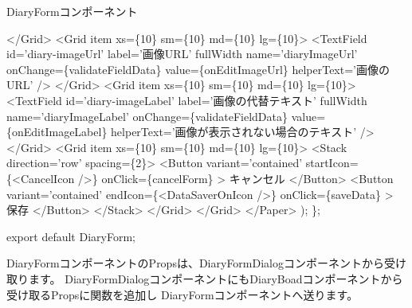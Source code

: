\begin{starterprogram}[]{DiaryFormコンポーネント}
{          \textless{}/Grid\textgreater{}
          \textless{}Grid item xs=\{10\} sm=\{10\} md=\{10\} lg=\{10\}\textgreater{}
            \textless{}TextField
              id='diary{-}imageUrl'
              label='画像URL'
              fullWidth
              name='diaryImageUrl'
              onChange=\{validateFieldData\}
              value=\{onEditImageUrl\}
              helperText='画像のURL'
            /\textgreater{}
          \textless{}/Grid\textgreater{}
          \textless{}Grid item xs=\{10\} sm=\{10\} md=\{10\} lg=\{10\}\textgreater{}
            \textless{}TextField
              id='diary{-}imageLabel'
              label='画像の代替テキスト'
              fullWidth
              name='diaryImageLabel'
              onChange=\{validateFieldData\}
              value=\{onEditImageLabel\}
              helperText='画像が表示されない場合のテキスト'
            /\textgreater{}
          \textless{}/Grid\textgreater{}
          \textless{}Grid item xs=\{10\} sm=\{10\} md=\{10\} lg=\{10\}\textgreater{}
            \textless{}Stack direction='row' spacing=\{2\}\textgreater{}
              \textless{}Button
                variant='contained'
                startIcon=\{\textless{}CancelIcon /\textgreater{}\}
                onClick=\{cancelForm\}
              \textgreater{}
                キャンセル
              \textless{}/Button\textgreater{}
              \textless{}Button
                variant='contained'
                endIcon=\{\textless{}DataSaverOnIcon /\textgreater{}\}
                onClick=\{saveData\}
              \textgreater{}
                保存
              \textless{}/Button\textgreater{}
            \textless{}/Stack\textgreater{}
          \textless{}/Grid\textgreater{}
        \textless{}/Grid\textgreater{}
      \textless{}/Paper\textgreater{}
    );
  \};

  export default DiaryForm;}\end{starterprogram}

DiaryFormコンポーネントのPropsは、DiaryFormDialogコンポーネントから受け取ります。
DiaryFormDialogコンポーネントにもDiaryBoadコンポーネントから受け取るPropsに関数を追加し
DiaryFormコンポーネントへ送ります。

